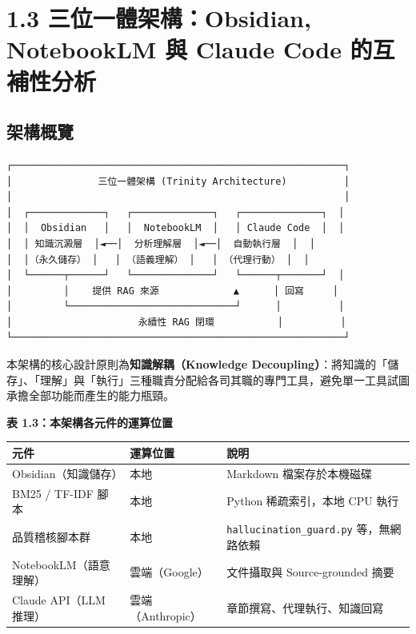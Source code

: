 \chapter{1.3 三位一體架構：Obsidian, NotebookLM 與 Claude Code
的互補性分析}\label{ux4e09ux4f4dux4e00ux9ad4ux67b6ux69cbobsidian-notebooklm-ux8207-claude-code-ux7684ux4e92ux88dcux6027ux5206ux6790}

\section{架構概覽}\label{ux67b6ux69cbux6982ux89bd}

\begin{verbatim}
┌──────────────────────────────────────────────────────────┐
│               三位一體架構 (Trinity Architecture)          │
│                                                          │
│  ┌─────────────┐   ┌──────────────┐   ┌──────────────┐  │
│  │  Obsidian   │   │  NotebookLM  │   │ Claude Code  │  │
│  │ 知識沉澱層  │◄──│  分析理解層  │◄──│  自動執行層  │  │
│  │（永久儲存） │   │ （語義理解） │   │ （代理行動） │  │
│  └──────┬──────┘   └──────────────┘   └──────┬───────┘  │
│         │    提供 RAG 來源             ▲      │ 回寫     │
│         └─────────────────────────────┘      │          │
│                      永續性 RAG 閉環           │          │
└──────────────────────────────────────────────────────────┘
\end{verbatim}

本架構的核心設計原則為\textbf{知識解耦（Knowledge
Decoupling）}：將知識的「儲存」、「理解」與「執行」三種職責分配給各司其職的專門工具，避免單一工具試圖承擔全部功能而產生的能力瓶頸。

\textbf{表 1.3：本架構各元件的運算位置}

{\def\LTcaptype{none} %
\begin{longtable}[]{@{}
  >{\raggedright\arraybackslash}p{}
  >{\raggedright\arraybackslash}p{}
  >{\raggedright\arraybackslash}p{}@{}}
\toprule\noalign{}
\begin{minipage}[b]{\linewidth}\raggedright
元件
\end{minipage} & \begin{minipage}[b]{\linewidth}\raggedright
運算位置
\end{minipage} & \begin{minipage}[b]{\linewidth}\raggedright
說明
\end{minipage} \\
\midrule\noalign{}
\endhead
\bottomrule\noalign{}
\endlastfoot
Obsidian（知識儲存） & 本地 & Markdown 檔案存於本機磁碟 \\
BM25 / TF-IDF 腳本 & 本地 & Python 稀疏索引，本地 CPU 執行 \\
品質稽核腳本群 & 本地 & \texttt{hallucination\_guard.py}
等，無網路依賴 \\
NotebookLM（語意理解） & 雲端（Google） & 文件攝取與 Source-grounded
摘要 \\
Claude API（LLM 推理） & 雲端（Anthropic） &
章節撰寫、代理執行、知識回寫 \\
\end{longtable}
}


